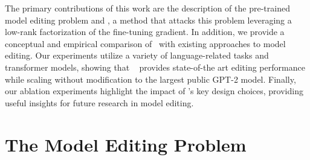 \documentclass{article}
\begin{document}
The primary contributions of this work are the description of the pre-trained model editing problem and \name, a method that attacks this problem leveraging a low-rank factorization of the fine-tuning gradient. In addition, we provide a conceptual and empirical comparison of \name~with existing approaches to model editing. Our experiments utilize a variety of language-related tasks and transformer models, showing that \name~ provides state-of-the art editing performance while scaling without modification to the largest public GPT-2 \citep{radford2019language} model.
Finally, our ablation experiments highlight the impact of \name's key design choices, 
providing useful insights for future research in model editing.

\section{The Model Editing Problem}

\end{document}
